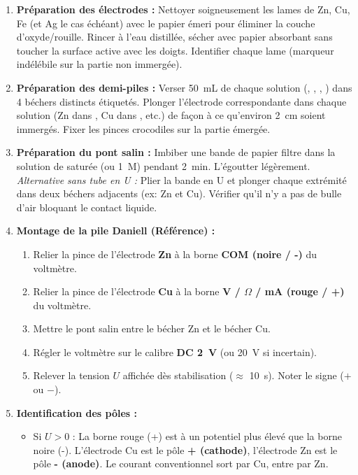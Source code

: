 \documentclass[11pt]{article}
\newcounter{popsec}
\newcounter{popsub}
\newcommand{\courssub}[1]{%
  \stepcounter{popsub}%
  \par\vspace{9pt}\noindent{\popxbold\fontsize{11.5}{13}\selectfont\color{popink}{\color{poporange}\thepopsec.\thepopsub}\hspace{6pt}#1}\par\nopagebreak\vspace{4pt}
}
\begin{document}
\courssub{Protocole}
\begin{enumerate}
    \item \textbf{Préparation des électrodes :} Nettoyer soigneusement les lames de Zn, Cu, Fe (et Ag le cas échéant) avec le papier émeri pour éliminer la couche d'oxyde/rouille. Rincer à l'eau distillée, sécher avec papier absorbant sans toucher la surface active avec les doigts. Identifier chaque lame (marqueur indélébile sur la partie non immergée).
    \item \textbf{Préparation des demi-piles :} Verser \SI{50}{mL} de chaque solution (, , , ) dans 4 béchers distincts étiquetés. Plonger l'électrode correspondante dans chaque solution (Zn dans , Cu dans , etc.) de façon à ce qu'environ \SI{2}{cm} soient immergés. Fixer les pinces crocodiles sur la partie émergée.
    \item \textbf{Préparation du pont salin :} Imbiber une bande de papier filtre dans la solution de  saturée (ou  \SI{1}{M}) pendant \SI{2}{min}. L'égoutter légèrement. \textit{Alternative sans tube en U :} Plier la bande en U et plonger chaque extrémité dans deux béchers adjacents (ex: Zn et Cu). Vérifier qu'il n'y a pas de bulle d'air bloquant le contact liquide.
    \item \textbf{Montage de la pile Daniell (Référence) :}
    \begin{enumerate}
        \item Relier la pince de l'électrode \textbf{Zn} à la borne \textbf{COM (noire / -)} du voltmètre.
        \item Relier la pince de l'électrode \textbf{Cu} à la borne \textbf{V / $\Omega$ / mA (rouge / +)} du voltmètre.
        \item Mettre le pont salin entre le bécher Zn et le bécher Cu.
        \item Régler le voltmètre sur le calibre \textbf{DC \SI{2}{V}} (ou \SI{20}{V} si incertain).
        \item Relever la tension $U$ affichée dès stabilisation ($\approx$ \SI{10}{s}). Noter le signe ($+$ ou $-$).
    \end{enumerate}
    \item \textbf{Identification des pôles :}
    \begin{itemize}
        \item Si $U > 0$ : La borne rouge (+) est à un potentiel plus élevé que la borne noire (-). L'électrode Cu est le pôle \textbf{+ (cathode)}, l'électrode Zn est le pôle \textbf{- (anode)}. Le courant conventionnel sort par Cu, entre par Zn.

\end{itemize}
\end{enumerate}
\end{document}
